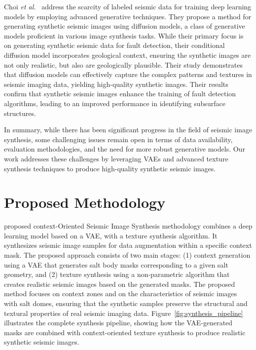 \documentclass{ieeeaccess}
\begin{document}
Choi \emph{et al.}~\cite{Choi2025} address the scarcity of labeled seismic data for training deep learning models by employing advanced generative techniques. They propose a method for generating synthetic seismic images using diffusion models, a class of generative models proficient in various image synthesis tasks. While their primary focus is on generating synthetic seismic data for fault detection, their conditional diffusion model incorporates geological context, ensuring the synthetic images are not only realistic, but also are geologically plausible. Their study demonstrates that diffusion models can effectively capture the complex patterns and textures in seismic imaging data, yielding high-quality synthetic images. Their results confirm that synthetic seismic images enhance the training of fault detection algorithms, leading to an improved performance in identifying subsurface structures.

In summary, while there has been significant progress in the field of seismic image synthesis, some challenging issues  remain open in terms of data availability, evaluation methodologies, and the need for more robust generative models. Our work addresses these challenges by leveraging VAEs and advanced texture synthesis techniques to produce high-quality synthetic seismic images.



\section{Proposed Methodology}
\label{sec:methodology}


 proposed context-Oriented Seismic Image Synthesis methodology combines a deep learning model based on a VAE, with a texture synthesis algorithm. It synthesizes seismic image samples for data augmentation within a specific context mask. The proposed approach consists of two main stages: (1) context generation using a VAE that generates salt body masks corresponding to a given salt geometry, and (2) texture synthesis using a non-parametric algorithm that creates realistic seismic images based on the generated masks. The proposed method focuses on context zones and on the characteristics of seismic images with salt domes, ensuring that the synthetic samples preserve the structural and textural properties of real seismic imaging data. Figure~\ref{fig:synthesis_pipeline} illustrates the complete synthesis pipeline, showing how the VAE-generated masks are combined with context-oriented texture synthesis to produce realistic synthetic seismic images.
\end{document}
